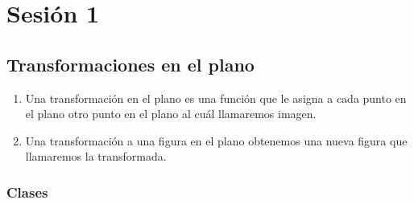 \section{Sesión 1}

\subsection{Transformaciones en el plano}

\begin{definicion}
	\begin{enumerate}
		\item 	Una transformación en el plano es una función que le asigna a cada punto en el plano otro punto en el plano al cuál llamaremos imagen. 
		\item Una transformación a una figura en el plano obtenemos una nueva figura que llamaremos la transformada.
	\end{enumerate}
\end{definicion}

\subsubsection{Clases}

